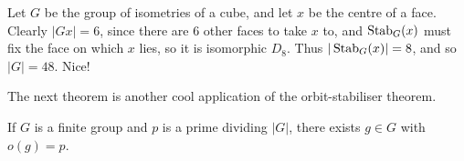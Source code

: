 \documentclass{../../template/note}
\begin{document}
    \begin{example*}
        Let \(G\) be the group of isometries of a cube, and let \(x\) be the centre of a face. Clearly \(|Gx| = 6\), since there are 6 other faces to take \(x\) to, and \(\operatorname{Stab}_G(x)\) must fix the face on which \(x\) lies, so it is isomorphic \(D_8\). Thus \(|\operatorname{Stab}_G(x)| = 8\), and so \(|G| = 48\). Nice!
    \end{example*}
    

    The next theorem is another cool application of the orbit-stabiliser theorem.

    \begin{theorem}[Cauchy]
        If \(G\) is a finite group and \(p\) is a prime dividing \(|G|\), there exists \(g \in G\) with \(o(g) = p\).
    \end{theorem}
    
\end{document}
